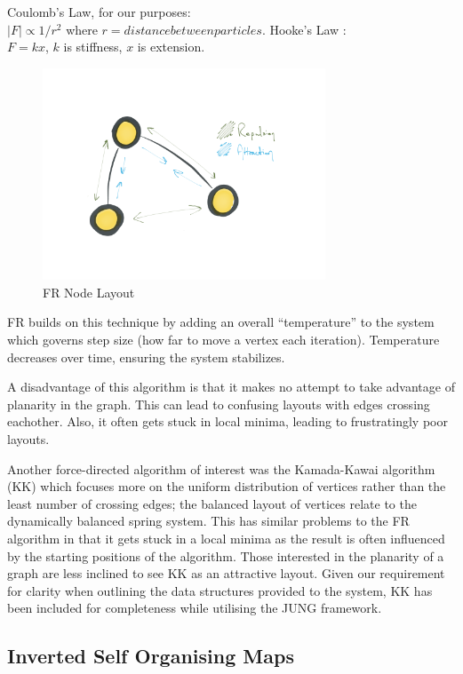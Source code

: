 \documentclass[11pt, a4paper]{report}
\begin{document}
Coulomb’s Law, for our purposes: \\
$|F| \propto 1 / r^2$ where $r = distance between particles$.
Hooke’s Law : \\
$F = k x$, $k$ is stiffness, $x$ is extension.

\begin{figure}[h]
        \centering
        \includegraphics[width=0.75\textwidth]{images/final/frnodes.png}
        \caption{FR Node Layout}
\end{figure}

FR builds on this technique by adding an overall “temperature” to the system which governs step size (how far to move a vertex each iteration). Temperature decreases over time, ensuring the system stabilizes.

A disadvantage of this algorithm is that it makes no attempt to take advantage of planarity in the graph. This can lead to confusing layouts with edges crossing eachother. Also, it often gets stuck in local minima, leading to frustratingly poor layouts.

Another force-directed algorithm of interest was the Kamada-Kawai algorithm (KK) which focuses more on the uniform distribution of vertices rather than the least number of crossing edges; the balanced layout of vertices relate to the dynamically balanced spring system. This has similar problems to the FR algorithm in that it gets stuck in a local minima as the result is often influenced by the starting positions of the algorithm. Those interested in the planarity of a graph are less inclined to see KK as an attractive layout. Given our requirement for clarity when outlining the data structures provided to the system, KK has been included for completeness while utilising the JUNG framework. 

\subsection{Inverted Self Organising Maps}
\end{document}
